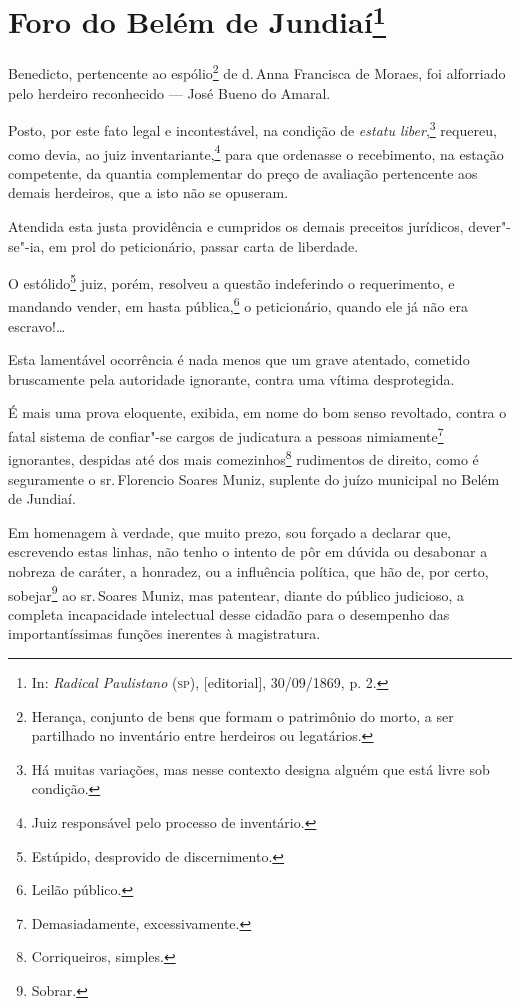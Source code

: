 \chapter{Foro do Belém de Jundiaí\footnote[*]{In: \emph{Radical
  Paulistano} (\textsc{sp}), {[}editorial{]}, 30/09/1869, p. 2.}}



Benedicto, pertencente ao espólio\footnote{Herança, conjunto de bens
  que formam o patrimônio do morto, a ser partilhado no inventário entre
  herdeiros ou legatários.} de d.\,Anna Francisca de Moraes, foi
alforriado pelo herdeiro reconhecido --- José Bueno do Amaral.

Posto, por este fato legal e incontestável, na condição de \emph{estatu
liber},\footnote{Há muitas variações, mas nesse contexto designa alguém
  que está livre sob condição.} requereu, como devia, ao juiz
inventariante,\footnote{Juiz responsável pelo processo de inventário.}
para que ordenasse o recebimento, na estação competente, da quantia
complementar do preço de avaliação pertencente aos demais herdeiros, que
a isto não se opuseram.

Atendida esta justa providência e cumpridos os demais preceitos
jurídicos, dever"-se"-ia, em prol do peticionário, passar carta de
liberdade.

O estólido\footnote{Estúpido, desprovido de discernimento.} juiz,
porém, resolveu a questão indeferindo o requerimento, e mandando vender,
em hasta pública,\footnote{Leilão público.} o peticionário, quando ele
já não era escravo!\ldots{}

Esta lamentável ocorrência é nada menos que um grave atentado, cometido
bruscamente pela autoridade ignorante, contra uma vítima desprotegida.

É mais uma prova eloquente, exibida, em nome do bom senso revoltado,
contra o fatal sistema de confiar"-se cargos de judicatura a pessoas
nimiamente\footnote{Demasiadamente, excessivamente.} ignorantes,
despidas até dos mais comezinhos\footnote{Corriqueiros, simples.}
rudimentos de direito, como é seguramente o sr.\,Florencio Soares Muniz,
suplente do juízo municipal no Belém de Jundiaí.

Em homenagem à verdade, que muito prezo, sou forçado a declarar que,
escrevendo estas linhas, não tenho o intento de pôr em dúvida ou
desabonar a nobreza de caráter, a honradez, ou a influência política,
que hão de, por certo, sobejar\footnote{Sobrar.} ao sr.\,Soares Muniz,
mas patentear, diante do público judicioso, a completa incapacidade
intelectual desse cidadão para o desempenho das importantíssimas funções
inerentes à magistratura.

